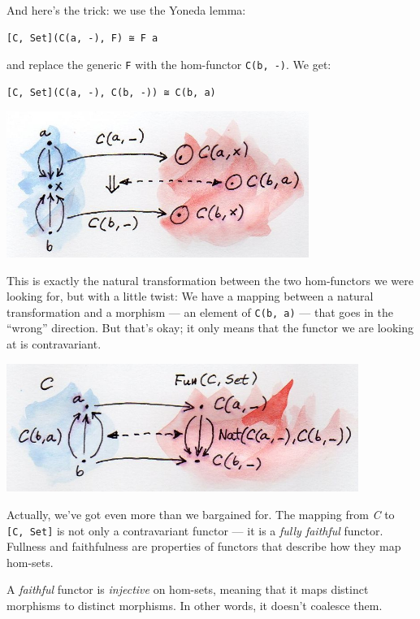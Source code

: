 And here's the trick: we use the Yoneda lemma:

\begin{verbatim}
[C, Set](C(a, -), F) ≅ F a
\end{verbatim}

and replace the generic \texttt{F} with the hom-functor
\texttt{C(b,\ -)}. We get:

\begin{verbatim}
[C, Set](C(a, -), C(b, -)) ≅ C(b, a)
\end{verbatim}

\includegraphics[width=3.87500in]{images/yoneda-embedding.jpg}

This is exactly the natural transformation between the two hom-functors
we were looking for, but with a little twist: We have a mapping between
a natural transformation and a morphism --- an element of
\texttt{C(b,\ a)} --- that goes in the ``wrong'' direction. But that's
okay; it only means that the functor we are looking at is contravariant.

\includegraphics[width=4.51042in]{images/yoneda-embedding-2.jpg}

Actually, we've got even more than we bargained for. The mapping from
\emph{C} to \texttt{{[}C,\ Set{]}} is not only a contravariant functor
--- it is a \emph{fully faithful} functor. Fullness and faithfulness are
properties of functors that describe how they map hom-sets.

A \emph{faithful} functor is \emph{injective} on hom-sets, meaning that
it maps distinct morphisms to distinct morphisms. In other words, it
doesn't coalesce them.

